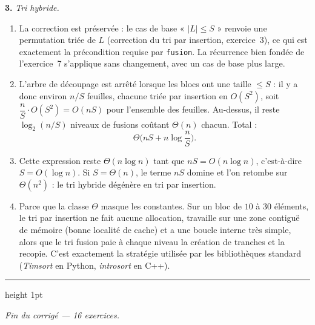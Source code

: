 \documentclass[11pt,a4paper]{article}
\begin{document}
\textbf{3.} \emph{Tri hybride.}
\begin{enumerate}[label=(\alph*),leftmargin=*,itemsep=3pt]
  \item La correction est préservée : le cas de base « $|L|\le S$ » renvoie une
        permutation triée de $L$ (correction du tri par insertion, exercice~3), ce qui est
        exactement la précondition requise par \texttt{fusion}. La récurrence bien fondée
        de l'exercice~7 s'applique sans changement, avec un cas de base plus large.
  \item L'arbre de découpage est arrêté lorsque les blocs ont une taille $\le S$ : il y a
        donc environ $n/S$ feuilles, chacune triée par insertion en $O(S^{2})$, soit
        $\dfrac nS\cdot O(S^{2})=O(nS)$ pour l'ensemble des feuilles. Au-dessus, il reste
        $\log_2(n/S)$ niveaux de fusions coûtant $\Theta(n)$ chacun. Total :
        \[
          \Theta\!\Big(nS + n\log\frac nS\Big).
        \]
  \item Cette expression reste $\Theta(n\log n)$ tant que $nS = O(n\log n)$, c'est-à-dire
        $S=O(\log n)$. Si $S=\Theta(n)$, le terme $nS$ domine et l'on retombe sur
        $\Theta(n^{2})$ : le tri hybride dégénère en tri par insertion.
  \item Parce que la classe $\Theta$ masque les constantes. Sur un bloc de $10$ à $30$
        éléments, le tri par insertion ne fait aucune allocation, travaille sur une zone
        contiguë de mémoire (bonne localité de cache) et a une boucle interne très
        simple, alors que le tri fusion paie à chaque niveau la création de tranches et
        la recopie. C'est exactement la stratégie utilisée par les bibliothèques
        standard (\emph{Timsort} en Python, \emph{introsort} en C++).
\end{enumerate}

\vspace{14pt}
{\color{teal}\hrule height 1pt}
\vspace{6pt}
\begin{center}
\small\itshape Fin du corrigé --- 16 exercices.
\end{center}
\end{document}
